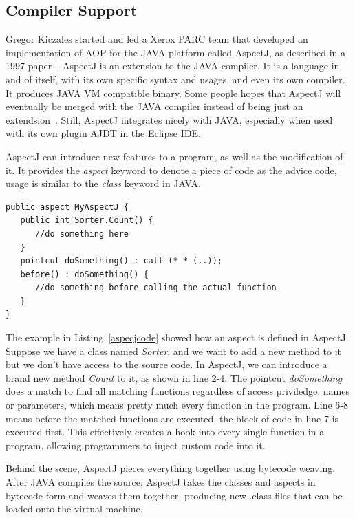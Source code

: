 \subsection{Compiler Support}

Gregor Kiczales started and led a Xerox PARC team that developed an implementation of AOP for the JAVA platform called AspectJ, as described in a 1997 paper~\cite{aop}. AspectJ is an extension to the JAVA compiler. It is a language in and of itself, with its own specific syntax and usages, and even its own compiler. It produces JAVA VM compatible binary. Some people hopes that AspectJ will eventually be merged with the JAVA compiler instead of being just an extendsion~\cite{aspectj_faq}. Still, AspectJ integrates nicely with JAVA, especially when used with its own plugin AJDT in the Eclipse IDE.

AspectJ can introduce new features to a program, as well as the modification of it. It provides the {\em aspect} keyword to denote a piece of code as the advice code, usage is similar to the {\em class} keyword in JAVA.

\begin{lstlisting}[caption={sample AspectJ code}, label=aspecjcode]
public aspect MyAspectJ {
   public int Sorter.Count() {
      //do something here
   }
   pointcut doSomething() : call (* * (..));
   before() : doSomething() {
      //do something before calling the actual function
   }
}
\end{lstlisting}

The example in Listing~\ref{aspecjcode} showed how an aspect is defined in AspectJ. Suppose we have a class named {\em Sorter}, and we want to add a new method to it but we don't have access to the source code. In AspectJ, we can introduce a brand new method {\em Count} to it, as shown in line 2-4. The pointcut {\em doSomething} does a match to find all matching functions regardless of access priviledge, names or parameters, which means pretty much every function in the program. Line 6-8 means before the matched functions are executed, the block of code in line 7 is executed first. This effectively creates a hook into every single function in a program, allowing programmers to inject custom code into it.

Behind the scene, AspectJ pieces everything together using bytecode weaving. After JAVA compiles the source, AspectJ takes the classes and aspects in bytecode form and weaves them together, producing new .class files that can be loaded onto the virtual machine.

